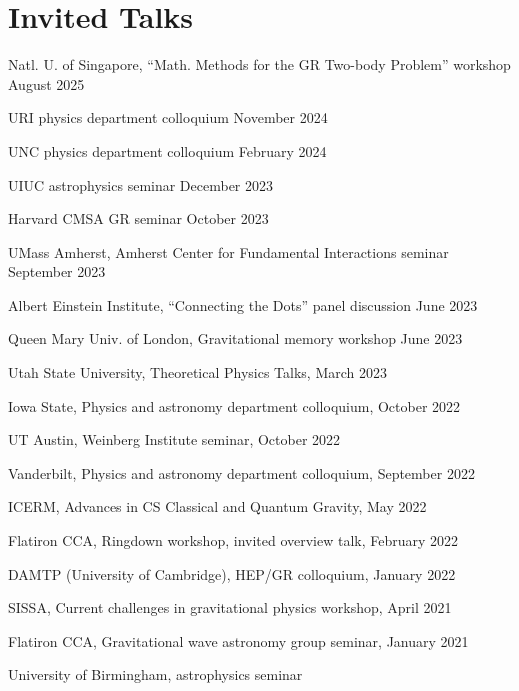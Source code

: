 \newcommand{\playsymbol}{$\blacktriangleright$}
\section{Invited Talks}
\secstartswithlist{}%
\begin{etaremune}
\item
  Natl. U. of Singapore, ``Math. Methods for the GR Two-body Problem'' workshop
  \hfill{}
  August 2025
\item
  URI physics department colloquium
  \hfill{}
  November 2024
\item
  UNC physics department colloquium
  \hfill{}
  February 2024
\item
  UIUC astrophysics seminar
  \hfill{}
  December 2023
\item
  Harvard CMSA GR seminar
  \hfill{}
  October 2023
\item
  UMass Amherst, Amherst Center for Fundamental Interactions seminar
  \hfill{}
  September 2023
\item
  Albert Einstein Institute,
  ``Connecting the Dots'' panel discussion
  \hfill{}
  June 2023
\item
  Queen Mary Univ. of London,
  Gravitational memory workshop
  \hfill{}
  June 2023
\item
  Utah State University, Theoretical Physics Talks,
  \hfill{}
  March 2023
\item
  Iowa State, Physics and astronomy department colloquium,
  \hfill{}
  October 2022
\item
  UT Austin, Weinberg Institute seminar,
  \hfill{}
  October 2022
\item
  Vanderbilt, Physics and astronomy department colloquium,
  \hfill{}
  September 2022
\item
  ICERM, Advances in CS Classical and Quantum Gravity,
  \hfill{}
  May 2022
\item
  Flatiron CCA, Ringdown workshop, invited overview talk,
  \hfill{}
  February 2022
\item
  DAMTP (University of Cambridge), HEP/GR colloquium,
  \hfill{}
  January 2022
\item
  SISSA, Current challenges in gravitational physics workshop,
  \hfill{}
  April 2021
\item
  Flatiron CCA, Gravitational wave astronomy group seminar,
  \hfill{}
  January 2021
\item
  University of Birmingham, astrophysics seminar

\end{etaremune}
